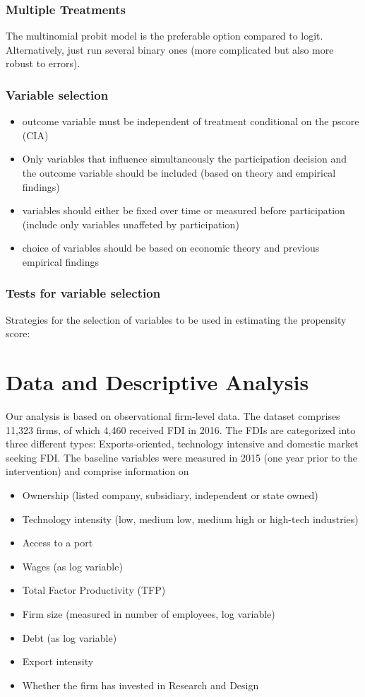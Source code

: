 \documentclass[a4paper,11pt]{scrartcl}
\begin{document}
\subsubsection*{Multiple Treatments}
The multinomial probit model is the preferable option compared to logit. Alternatively, just run several binary ones (more complicated but also more robust to errors).

\subsubsection*{Variable selection}
\begin{itemize}
\item outcome variable must be independent of treatment conditional on the pscore (CIA)
\item Only variables that influence simultaneously the participation decision and the outcome variable should be included (based on theory and empirical findings)
\item variables should either be fixed over time or measured before participation (include only variables unaffeted by participation)
\item choice of variables should be based on economic theory and previous empirical findings
\end{itemize}

\subsubsection*{Tests for variable selection}
Strategies for the selection of variables to be used in estimating the propensity score:



\section{Data and Descriptive Analysis}
Our analysis is based on observational firm-level data. The dataset comprises 11,323 firms, of which 4,460 received FDI in 2016. The FDIs are categorized into three different types: Exports-oriented, technology intensive and domestic market seeking FDI. The baseline variables were measured in 2015 (one year prior to the intervention) and comprise information on 
\begin{itemize}
\item Ownership (listed company, subsidiary, independent or state owned)
\item Technology intensity (low, medium low, medium high or high-tech industries) 
\item Access to a port
\item Wages (as log variable)
\item Total Factor Productivity (TFP)
\item Firm size (measured in number of employees, log variable)
\item Debt (as log variable)
\item Export intensity
\item Whether the firm has invested in Research and Design
\end{itemize}
 
\end{document}
